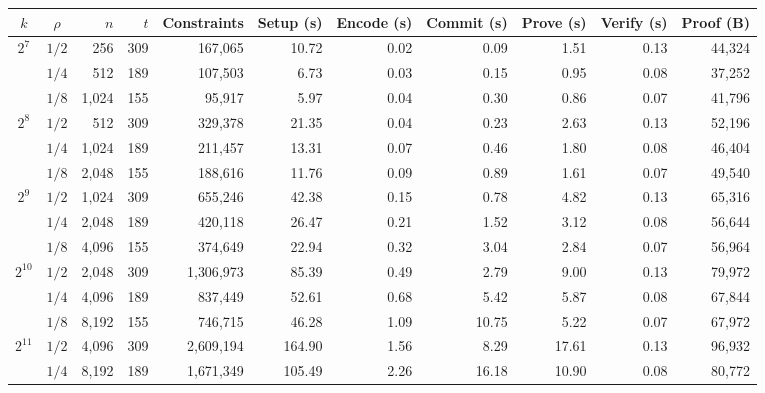 \begin{table}[!t]
\centering
\scriptsize
\setlength{\tabcolsep}{4pt}
\begin{revblock}[unbreakable]
\begin{tabular*}{\linewidth}{@{\extracolsep{\fill}}ccrrrrrrrrr@{}}
\toprule
\textbf{\(k\)} & \textbf{\(\rho\)} & \textbf{\(n\)} & \textbf{\(t\)}
& \textbf{Constraints} & \textbf{Setup (s)} & \textbf{Encode (s)}
& \textbf{Commit (s)} & \textbf{Prove (s)}
& \textbf{Verify (s)} & \textbf{Proof (B)} \\
\midrule
\multirow{3}{*}{\(2^7\)}
& \(1/2\) & 256 & 309 & 167{,}065 & 10.72 & 0.02 & 0.09 & 1.51 & 0.13 & 44{,}324 \\
& \(1/4\) & 512 & 189 & 107{,}503 & 6.73 & 0.03 & 0.15 & 0.95 & 0.08 & 37{,}252 \\
& \(1/8\) & 1{,}024 & 155 & 95{,}917 & 5.97 & 0.04 & 0.30 & 0.86 & 0.07 & 41{,}796 \\
\midrule
\multirow{3}{*}{\(2^8\)}
& \(1/2\) & 512 & 309 & 329{,}378 & 21.35 & 0.04 & 0.23 & 2.63 & 0.13 & 52{,}196 \\
& \(1/4\) & 1{,}024 & 189 & 211{,}457 & 13.31 & 0.07 & 0.46 & 1.80 & 0.08 & 46{,}404 \\
& \(1/8\) & 2{,}048 & 155 & 188{,}616 & 11.76 & 0.09 & 0.89 & 1.61 & 0.07 & 49{,}540 \\
\midrule
\multirow{3}{*}{\(2^9\)}
& \(1/2\) & 1{,}024 & 309 & 655{,}246 & 42.38 & 0.15 & 0.78 & 4.82 & 0.13 & 65{,}316 \\
& \(1/4\) & 2{,}048 & 189 & 420{,}118 & 26.47 & 0.21 & 1.52 & 3.12 & 0.08 & 56{,}644 \\
& \(1/8\) & 4{,}096 & 155 & 374{,}649 & 22.94 & 0.32 & 3.04 & 2.84 & 0.07 & 56{,}964 \\
\midrule
\multirow{3}{*}{\(2^{10}\)}
& \(1/2\) & 2{,}048 & 309 & 1{,}306{,}973 & 85.39 & 0.49 & 2.79 & 9.00 & 0.13 & 79{,}972 \\
& \(1/4\) & 4{,}096 & 189 & 837{,}449 & 52.61 & 0.68 & 5.42 & 5.87 & 0.08 & 67{,}844 \\
& \(1/8\) & 8{,}192 & 155 & 746{,}715 & 46.28 & 1.09 & 10.75 & 5.22 & 0.07 & 67{,}972 \\
\midrule
\multirow{3}{*}{\(2^{11}\)}
& \(1/2\) & 4{,}096 & 309 & 2{,}609{,}194 & 164.90 & 1.56 & 8.29 & 17.61 & 0.13 & 96{,}932 \\
& \(1/4\) & 8{,}192 & 189 & 1{,}671{,}349 & 105.49 & 2.26 & 16.18 & 10.90 & 0.08 & 80{,}772 \\

\end{tabular*}
\end{revblock}
\end{table}
